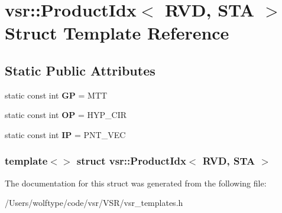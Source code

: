 \hypertarget{structvsr_1_1_product_idx_3_01_r_v_d_00_01_s_t_a_01_4}{\section{vsr\-:\-:Product\-Idx$<$ R\-V\-D, S\-T\-A $>$ Struct Template Reference}
\label{structvsr_1_1_product_idx_3_01_r_v_d_00_01_s_t_a_01_4}
}
\subsection*{Static Public Attributes}
\begin{DoxyCompactItemize}
\item 
\hypertarget{structvsr_1_1_product_idx_3_01_r_v_d_00_01_s_t_a_01_4_a42ead81ae60bf417d1b355d0edb25641}{static const int {\bfseries G\-P} = M\-T\-T}\label{structvsr_1_1_product_idx_3_01_r_v_d_00_01_s_t_a_01_4_a42ead81ae60bf417d1b355d0edb25641}

\item 
\hypertarget{structvsr_1_1_product_idx_3_01_r_v_d_00_01_s_t_a_01_4_a4e31c90b9049bb0996d136dd807f2dd9}{static const int {\bfseries O\-P} = H\-Y\-P\-\_\-\-C\-I\-R}\label{structvsr_1_1_product_idx_3_01_r_v_d_00_01_s_t_a_01_4_a4e31c90b9049bb0996d136dd807f2dd9}

\item 
\hypertarget{structvsr_1_1_product_idx_3_01_r_v_d_00_01_s_t_a_01_4_a16594997a2e23d7431bc85ebecc1285f}{static const int {\bfseries I\-P} = P\-N\-T\-\_\-\-V\-E\-C}\label{structvsr_1_1_product_idx_3_01_r_v_d_00_01_s_t_a_01_4_a16594997a2e23d7431bc85ebecc1285f}

\end{DoxyCompactItemize}
\subsubsection*{template$<$$>$ struct vsr\-::\-Product\-Idx$<$ R\-V\-D, S\-T\-A $>$}



The documentation for this struct was generated from the following file\-:\begin{DoxyCompactItemize}
\item 
/\-Users/wolftype/code/vsr/\-V\-S\-R/vsr\-\_\-templates.\-h\end{DoxyCompactItemize}
